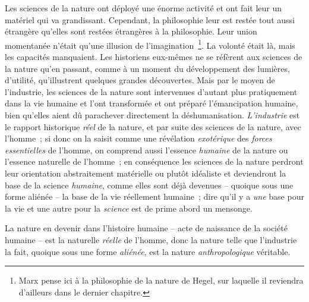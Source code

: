 \documentclass[french,twoside]{book} %
\begin{document}
Les sciences de la nature ont déployé une énorme activité et ont fait leur un matériel qui va grandissant. Cependant, la philosophie leur est restée tout aussi étrangère qu’elles sont restées étrangères à la philosophie. Leur union momentanée n’était qu’une illusion de l’imagination \footnote{Marx pense ici à la philosophie de la nature de Hegel, sur laquelle il reviendra d’ailleurs dans le dernier chapitre.}. La volonté était là, mais les capacités manquaient. Les historiens eux-mêmes ne se réfèrent aux sciences de la nature qu’en passant, comme à un moment du développement des lumières, d’utilité, qu’illustrent quelques grandes découvertes. Mais par le moyen de l’industrie, les sciences de la nature sont intervenues d’autant plus pratiquement dans la vie humaine et l’ont transformée et ont préparé l’émancipation humaine, bien qu’elles aient dû parachever directement la déshumanisation. \emph{L’industrie} est le rapport historique \emph{réel} de la nature, et par suite des sciences de la nature, avec l’homme ; si donc on la saisit comme une révélation \emph{exotérique} des \emph{forces essentielles} de l’homme, on comprend aussi l’essence \emph{humaine} de la nature ou l’essence naturelle de l’homme ; en conséquence les sciences de la nature perdront leur orientation abstraitement matérielle ou plutôt idéaliste et deviendront la base de la science \emph{humaine}, comme elles sont déjà devenues – quoique sous une forme aliénée – la base de la vie réellement humaine ; dire qu’il y a \emph{une} base pour la vie et une autre pour la \emph{science} est de prime abord un mensonge.\par
La nature en devenir dans l’histoire humaine – acte de naissance de la société humaine – est la naturelle \emph{réelle} de l’homme, donc la nature telle que l’industrie la fait, quoique sous une forme \emph{aliénée}, est la nature \emph{anthropologique} véritable.\par
\end{document}
